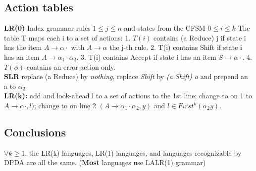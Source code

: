 \subsection*{Action tables}
\textbf{LR(0)} Index grammar rules $1 \leqslant j \leqslant n$ and states from the CFSM $0 \leqslant i \leqslant k$ The table T maps each i to a set of actions: 1. $T(i)$ contains (a Reduce) j if state i has the item $A \rightarrow \alpha \cdotp$ with $A \rightarrow \alpha$ the j-th rule. 2. T(i) contains Shift if state i has an item $A \rightarrow \alpha_1 \cdotp \alpha_2$. 3. T(i) contains Accept if state i has an item $S \rightarrow \alpha \cdotp$. 4. $T(\phi)$ contains an error action only.\\
\textbf{SLR} replace (a Reduce) by \textit{nothing}, replace \textit{Shift} by \textit{(a Shift) a} and prepend an a to $\alpha_2$\\
\textbf{LR(k):} add and look-ahead l to a set of actions to the 1st line; change to on 1 to $A \rightarrow \alpha \cdotp , l)$; change to on line 2 $(A \rightarrow \alpha_1 \cdotp \alpha_2,y)$ and $l \in First^k(\alpha_2 y)$.
\subsection*{Conclusions}
$\forall k \geqslant 1$, the LR(k) languages, LR(1) languages, and languages recognizable by DPDA are all the same. (\textbf{Most} languages use LALR(1) grammar)
